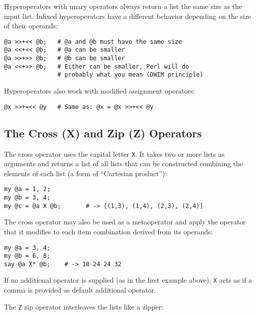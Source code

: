 Hyperoperators with unary operators always return a 
list the same size as the input list. Infixed 
hyperoperators have a different behavior depending on 
the size of their operands:

\begin{verbatim}
@a >>+<< @b;   # @a and @b must have the same size
@a <<+<< @b;   # @a can be smaller
@a >>+>> @b;   # @b can be smaller
@a <<+>> @b;   # Either can be smaller, Perl will do 
               # probably what you mean (DWIM principle)
\end{verbatim}

Hyperoperators also work with modified assignment 
operators:

\begin{verbatim}
@x >>+=<< @y   # Same as: @x = @x >>+<< @y
\end{verbatim}

\subsection{The Cross (X) and Zip (Z) Operators}

The cross operator uses the capital letter \verb"X".
It takes two or more lists as arguments and returns a list 
of all lists that can be constructed combining the elements 
of each list (a form of ``Cartesian product''):

\begin{verbatim}
my @a = 1, 2;
my @b = 3, 4;
my @c = @a X @b;       # -> [(1,3), (1,4), (2,3), (2,4)]
\end{verbatim}

The cross operator may also be used as a metaoperator and 
apply the operator that it modifies to each item combination 
derived from its operands:

\begin{verbatim}
my @a = 3, 4;
my @b = 6, 8;
say @a X* @b;    # -> 18 24 24 32
\end{verbatim}

If no additional operator is supplied (as in the first 
example above), \verb"X" acts as if a comma is 
provided as default additional operator. 

The \verb"Z" zip operator interleaves the lists 
like a zipper:

